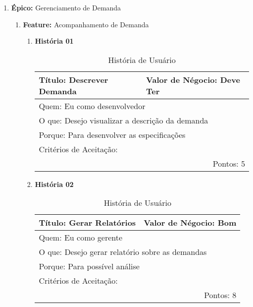 \begin{enumerate}
	\item \textbf{Épico:} Gerenciamento de Demanda
		\begin{enumerate}
			\item \textbf{Feature:} Acompanhamento de Demanda
				\begin{enumerate}
					\item \textbf{História 01}
						\begin{table}[H]
							\begin{tabular}{|p{10cm}|l|}
								\hline 
								Título: Descrever Demanda & Valor de Négocio: Deve Ter\tabularnewline
								\hline 
								\multicolumn{2}{|l|}{Quem: Eu como desenvolvedor}\tabularnewline
								\hline 
								\multicolumn{2}{|l|}{O que: Desejo visualizar a descrição da demanda}\tabularnewline
								\hline 
								\multicolumn{2}{|l|}{Porque: Para desenvolver as especificações}\tabularnewline
								\hline 
								\multicolumn{2}{|l|}{Critérios de Aceitação:}\tabularnewline
								\hline 
								\multicolumn{2}{|r|}{Pontos: 5}\tabularnewline
								\hline 
							\end{tabular}
							\caption{História de Usuário}
							\label{Historia_de_Usuario}
						\end{table}

					\item \textbf{História 02}
						\begin{table}[H]
							\begin{tabular}{|p{10cm}|l|}
								\hline 
								Título: Gerar Relatórios & Valor de Négocio: Bom\tabularnewline
								\hline 
								\multicolumn{2}{|l|}{Quem: Eu como gerente }\tabularnewline
								\hline 
								\multicolumn{2}{|l|}{O que: Desejo gerar relatório sobre as demandas}\tabularnewline
								\hline 
								\multicolumn{2}{|l|}{Porque: Para possível análise}\tabularnewline
								\hline 
								\multicolumn{2}{|l|}{Critérios de Aceitação:}
								\tabularnewline
								\hline 
								\multicolumn{2}{|r|}{Pontos: 8}\tabularnewline
								\hline 
							\end{tabular}
							\caption{História de Usuário}
							\label{Historia_de_Usuario}
						\end{table}


\end{enumerate}
\end{enumerate}
\end{enumerate}
